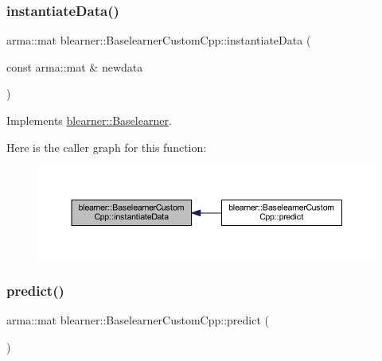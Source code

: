 \subsubsection{\texorpdfstring{instantiate\+Data()}{instantiateData()}}
{\footnotesize\ttfamily arma\+::mat blearner\+::\+Baselearner\+Custom\+Cpp\+::instantiate\+Data (\begin{DoxyParamCaption}\item[{const arma\+::mat \&}]{newdata }\end{DoxyParamCaption})\hspace{0.3cm}{\ttfamily [virtual]}}



Implements \mbox{\hyperlink{classblearner_1_1_baselearner_af01f1b8c4540927705ff79c3649489f7}{blearner\+::\+Baselearner}}.

Here is the caller graph for this function\+:
\nopagebreak
\begin{figure}[H]
\begin{center}
\leavevmode
\includegraphics[width=350pt]{classblearner_1_1_baselearner_custom_cpp_ae130d3b469eff32c8e0be12d925cf88f_icgraph}
\end{center}
\end{figure}
\mbox{\label{classblearner_1_1_baselearner_custom_cpp_a88c17ed1e32255e482f34695e06e7d25}} 
\subsubsection{\texorpdfstring{predict()}{predict()}\hspace{0.1cm}{\footnotesize\ttfamily [1/2]}}
{\footnotesize\ttfamily arma\+::mat blearner\+::\+Baselearner\+Custom\+Cpp\+::predict (\begin{DoxyParamCaption}{ }\end{DoxyParamCaption})\hspace{0.3cm}{\ttfamily [virtual]}}



